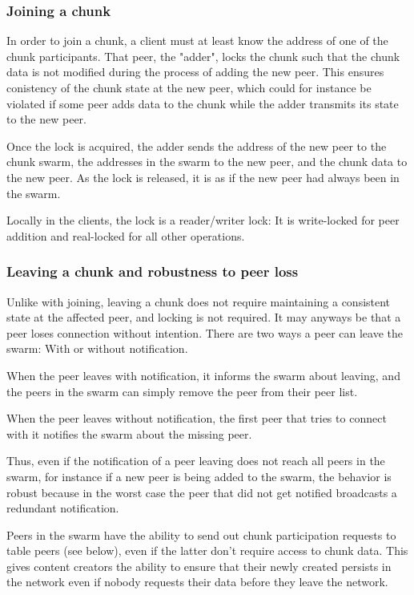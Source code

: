\documentclass{article}
\begin{document}
\subsubsection{Joining a chunk}

In order to join a chunk, a client must at least know the address of one of the
chunk participants. That peer, the "adder", locks the chunk such that the chunk
data is not modified during the process of adding the new peer. This ensures
conistency of the chunk state at the new peer, which could for instance be
violated if some peer adds data to the chunk while the adder transmits its state
to the new peer.

Once the lock is acquired, the adder sends the address of the new peer to the
chunk swarm, the addresses in the swarm to the new peer, and the chunk data to
the new peer. As the lock is released, it is as if the new peer had always been
in the swarm.

Locally in the clients, the lock is a reader/writer lock: It is write-locked
for peer addition and real-locked for all other operations.

\subsubsection{Leaving a chunk and robustness to peer loss}

Unlike with joining, leaving a chunk does not require maintaining a consistent
state at the affected peer, and locking is not required. It may anyways be that
a peer loses connection without intention. There are two ways a peer can leave
the swarm: With or without notification.

When the peer leaves with notification, it informs the swarm about leaving, and
the peers in the swarm can simply remove the peer from their peer list.

When the peer leaves without notification, the first peer that tries to connect
with it notifies the swarm about the missing peer.

Thus, even if the notification of a peer leaving does not reach all peers in the
swarm, for instance if a new peer is being added to the swarm, the behavior
is robust because in the worst case the peer that did not get notified
broadcasts a redundant notification.

Peers in the swarm have the ability to send out chunk participation requests
to table peers (see below), even if the latter don't require access to chunk
data. This gives content creators the ability to ensure that their newly created
persists in the network even if nobody requests their data before they leave the
network. 
\end{document}

